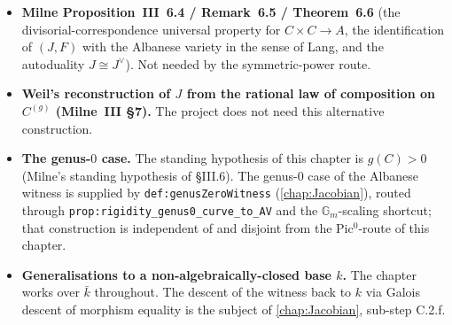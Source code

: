 \begin{itemize}
    route is therefore demoted and replaced by the symmetric-power route
    of this chapter. A reference recording of the moduli wording is given
    in the ``Alternative route history'' \texttt{\%~NOTE} block at the end
    of this file.
  \item \textbf{Milne Proposition~III~6.4 / Remark~6.5 / Theorem~6.6} (the
    divisorial-correspondence universal property for \(C \times C \to A\),
    the identification of \((J, F)\) with the Albanese variety in the sense
    of Lang, and the autoduality \(J \cong J^\vee\)). Not needed by the
    symmetric-power route.
  \item \textbf{Weil's reconstruction of \(J\) from the rational law of
    composition on \(C^{(g)}\) (Milne~III \S 7).} The project does not need
    this alternative construction.
  \item \textbf{The genus-\(0\) case.} The standing hypothesis of this chapter
    is \(g(C) > 0\) (Milne's standing hypothesis of \S III.6). The genus-\(0\)
    case of the Albanese witness is supplied by
    \texttt{def:genusZeroWitness} (\cref{chap:Jacobian}), routed through
    \texttt{prop:rigidity_genus0_curve_to_AV} and the \(\mathbb G_m\)-scaling
    shortcut; that construction is independent of and disjoint from the
    Pic\(^0\)-route of this chapter.
  \item \textbf{Generalisations to a non-algebraically-closed base \(k\).}
    The chapter works over \(\bar k\) throughout. The descent of the witness
    back to \(k\) via Galois descent of morphism equality is the subject of
    \cref{chap:Jacobian}, sub-step C.2.f.
\end{itemize}

